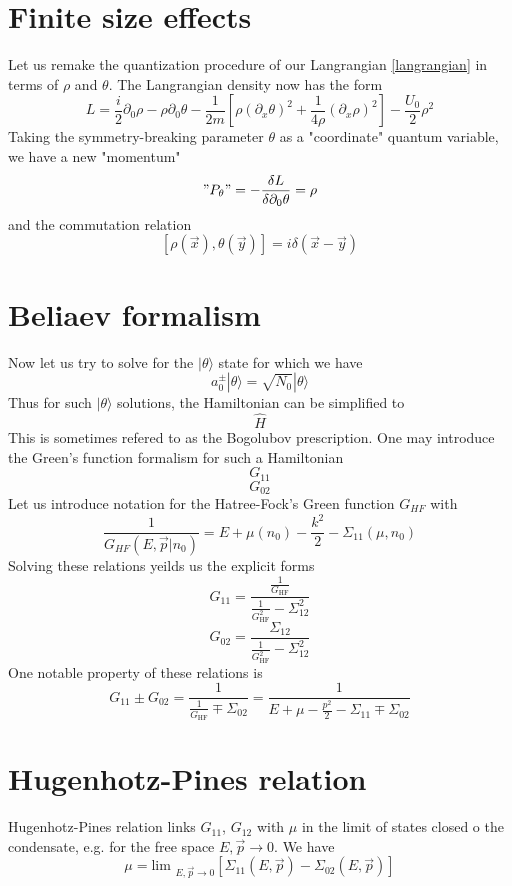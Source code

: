 \documentclass[8pt,letterpaper,notitlepage]{article}
\begin{document}
\section{Finite size effects}
Let us remake the quantization procedure of our Langrangian \ref{langrangian} in terms of $\rho$ and $\theta$. The Langrangian density now has the form
\begin{equation}
L = \frac{i}{2} \partial_0 \rho - \rho \partial_0 \theta - \frac{1}{2m}
\left[ \rho (\partial_x \theta)^2 + \frac{1}{4 \rho} (\partial_x \rho)^2 \right] - \frac{U_0}{2} \rho^2
\end{equation}
Taking the symmetry-breaking parameter $\theta$ as a "coordinate" quantum variable, we have a new "momentum" 
\begin{equation}
"P_\theta" = - \frac{\delta L }{\delta \partial_0 \theta} = \rho
\end{equation}
and the commutation relation
\[
[ \rho (\vec{x}) , \theta (\vec{y})] = i \delta(\vec{x} - \vec{y})
\]

\section{Beliaev formalism}
Now let us try to solve for the $| \theta \rangle$ state for which we have 
\[
a^{\pm}_0 | \theta \rangle = \sqrt{N_0} | \theta \rangle
\]
Thus for such  $| \theta \rangle$ solutions, the Hamiltonian can be simplified to
\[
\hat{H}
\]
This is sometimes refered to as the Bogolubov prescription. One may introduce the Green's function formalism for such a Hamiltonian
\[
G_{11}
\]
\[
G_{02}
\]
Let us introduce notation for the Hatree-Fock's Green function $G_{HF}$ with
\[
\frac{1}{G_{HF}(E,  \vec{p} | n_0)} = E + \mu (n_0) - \frac{k^2}{2} - \Sigma_{11}(\mu,  n_0)
\]
Solving these relations yeilds us the explicit forms
\[
G_{11} = \frac{\frac{1}{G_{\textrm{HF}}}}{\frac{1}{G_{\textrm{HF}}^2} - \Sigma_{12}^2}
\]
\[
G_{02} = \frac{\Sigma_{12}}{\frac{1}{G_{\textrm{HF}}^2} - \Sigma_{12}^2} 
\]
One notable property of these relations is
\[
G_{11} \pm G_{02} = \frac{1}{\frac{1}{G_{\textrm{HF}}} \mp \Sigma_{02}} = \frac{1}{E + \mu - \frac{p^2}{2} - \Sigma_{11}  \mp \Sigma_{02}}
\]
\section{Hugenhotz-Pines relation}
Hugenhotz-Pines relation links $G_{11}$, $G_{12}$ with $\mu$ in the limit of states closed o the condensate, e.g. for the free space $E, \vec{p} \rightarrow 0$. We have
\[
\mu = \textrm{lim }_{E, \vec{p} \rightarrow 0} \left[ \Sigma_{11} (E , \vec{p}) - \Sigma_{02} (E , \vec{p}) \right]
\]


\end{document}
